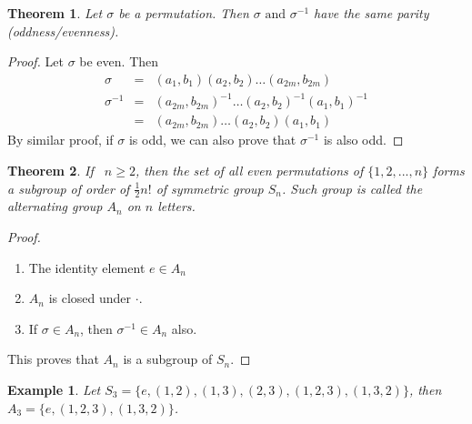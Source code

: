 \documentclass{article}
\theoremstyle{MyNonumberplain}
\theoremstyle{break}
\newtheorem*{proof}{Proof. }
\newcommand{\infixand}{\text{ and }}
\theoremstyle{break}
\newtheorem{theorem}{Theorem}[section]
\newtheorem{example}{Example}[section]
\theoremstyle{break}
\theoremstyle{definition}
\theoremstyle{break}
\begin{document}
\begin{thmbox}
    \begin{theorem}
        Let $\sigma$ be a permutation. Then $\sigma \infixand \sigma^{- 1}$ have the same parity (oddness/evenness).
    \end{theorem}
    \begin{prfbox}
        \begin{proof}
            Let $\sigma$ be even. Then
            \begin{eqnarray*}
              \sigma & = & (a_1, b_1) (a_2, b_2) \ldots (a_{2 m}, b_{2 m})\\
              \sigma^{- 1} & = & (a_{2 m}, b_{2 m})^{- 1} \ldots (a_2, b_2)^{- 1} (a_1,
              b_1)^{- 1}\\
              & = & (a_{2 m}, b_{2 m}) \ldots (a_2, b_2) (a_1, b_1)
            \end{eqnarray*}
            By similar proof, if $\sigma$ is odd, we can also prove that $\sigma^{- 1}$ is
            also odd.
        \end{proof}
    \end{prfbox}
\end{thmbox}

\begin{thmbox}
    \begin{theorem}
        If \ $n \geq 2$, then the set of all even permutations of $\{1, 2, . . ., n\}$
        forms a subgroup of order of $\frac{1}{2} n!$ of
        symmetric group $S_n$. Such group is called the alternating group $A_n$ on $n$
        letters.
    \end{theorem}
    \begin{prfbox}
        \begin{proof}
            \begin{enumerate}
                \item The identity element $e \in A_n$\bigskip
                \item $A_n$ is closed under $\cdot$.\bigskip
                \item If $\sigma \in A_n$, then $\sigma^{- 1} \in A_n$ also.\bigskip
            \end{enumerate}
            This proves that $A_n$ is a subgroup of $S_n$. 
        \end{proof}
    \end{prfbox}
\end{thmbox}

\begin{expbox}
    \begin{example}
        Let $S_3 = \{ e, (1, 2), (1, 3), (2, 3), (1, 2, 3), (1, 3, 2) \}$, then $A_3 =\{ e, (1, 2, 3), (1, 3, 2) \}$.
    \end{example}
\end{expbox}
\end{document}
